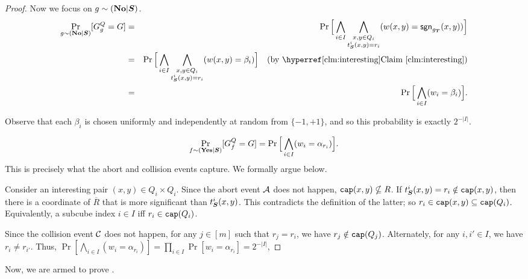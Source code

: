 \begin{proof}
	Now we focus on $g \sim (\mathbf {No}|\boldsymbol{S})$.
	\begin{eqnarray*}
		\Pr_{g\sim (\No|\bS)}[G^Q_g = G]
		& = & \Pr\Big[\bigwedge_{i \in I} \bigwedge_{\substack{x,y \in Q_i \\ \coord{i}{\bS}(x,y) = r_i}}
		(w(x,y) = \sgn_{g_{\bT}}(x,y))\Big]  \\
		& = & \Pr\Big[\bigwedge_{i \in I} \bigwedge_{\substack{x,y \in Q_i \\ \coord{i}{\bS}(x,y) = r_i}}
		(w(x,y) = \beta_{i})\Big]  \ \ \ \textrm{(by \Clm{interesting})}\\
		& = & \Pr\Big[\bigwedge_{i \in I} (w_i = \beta_{i})\Big].
	\end{eqnarray*}
	
	\noindent Observe that each $\beta_{i}$ is chosen uniformly and independently at random from $\{-1,+1\}$, and so this 	probability is exactly $2^{-|I|}$.
	
	$$ \Pr_{f\sim (\mathbf{Yes}|\boldsymbol{S})}[G^Q_f = G] = \Pr \Big[\bigwedge_{i \in I} (w_i = \alpha_{r_i})\Big] .$$
This is precisely what the abort and collision
	events capture. We formally argue below.
	
	Consider an interesting pair $(x,y) \in Q_i \times Q_i$. Since the abort event ${\cal A}$ does
	not happen, $\mathtt{cap}(x,y) \nsubseteq R$. If $t^{i}_{\boldsymbol{S}}(x,y) = r_i \notin \mathtt{cap}(x,y)$,
	then there is a coordinate of $\overline{R}$ that is more significant than $t^{i}_{\boldsymbol{S}}(x,y)$.
	This contradicts the definition of the latter; so $r_i \in \mathtt{cap}(x,y) \subseteq \mathtt{cap}(Q_i)$.
	Equivalently, a subcube index $i \in I$ iff $r_i \in \mathtt{cap}(Q_i)$.
	
	Since the collision event ${\cal C}$ does not happen, for any $j \in [m]$ such that $r_j = r_i$, we have $r_j \notin \mathtt{cap}(Q_j)$. 
	Alternately, for any $i,i' \in I$,
 we have $r_i \neq r_{i'}$. Thus, $\Pr[\bigwedge_{i \in I}(w_i = \alpha_{r_i})]
	= \prod_{i \in I}\Pr[w_i = \alpha_{r_i}] = 2^{-|I|}$,
\end{proof}

\noindent Now, we are armed to prove .

